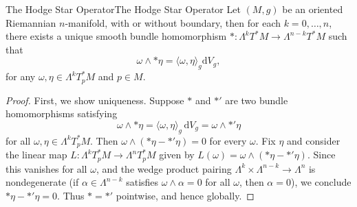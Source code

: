 \documentclass[../main.tex]{subfiles}
\begin{document}
\begin{theorem}{The Hodge Star Operator}{The Hodge Star Operator}
  Let $(M,g)$ be an oriented Riemannian $n$-manifold, with or without boundary, then for each $k = 0, \ldots , n$, there exists a unique smooth bundle homomorphism $*: \Lambda^k T^*M \to \Lambda^{n-k} T^*M$ such that
  \begin{equation}
    \omega \wedge *\eta = \langle \omega, \eta \rangle_g \mathrm{d} V_g,
  \end{equation}
  for any $\omega, \eta \in \Lambda^k T_p^*M$ and $p\in M$.
\end{theorem}
\begin{proof}
  First, we show uniqueness. Suppose $*$ and $*'$ are two bundle homomorphisms satisfying
  \begin{equation*}
  \omega \wedge *\eta = \langle \omega, \eta\rangle_g \, \mathrm{d}V_g = \omega \wedge *'\eta
  \end{equation*}
  for all $\omega, \eta \in \Lambda^k T_p^*M$. Then $\omega \wedge (*\eta - *'\eta) = 0$ for every $\omega$. Fix $\eta$ and consider the linear map $L: \Lambda^k T_p^*M \to \Lambda^n T_p^*M$ given by $L(\omega) = \omega \wedge (*\eta - *'\eta)$. Since this vanishes for all $\omega$, and the wedge product pairing $\Lambda^k \times \Lambda^{n-k} \to \Lambda^n$ is nondegenerate (if $\alpha \in \Lambda^{n-k}$ satisfies $\omega \wedge \alpha = 0$ for all $\omega$, then $\alpha = 0$), we conclude $*\eta - *'\eta = 0$. Thus $* = *'$ pointwise, and hence globally.


\end{proof}
\end{document}
